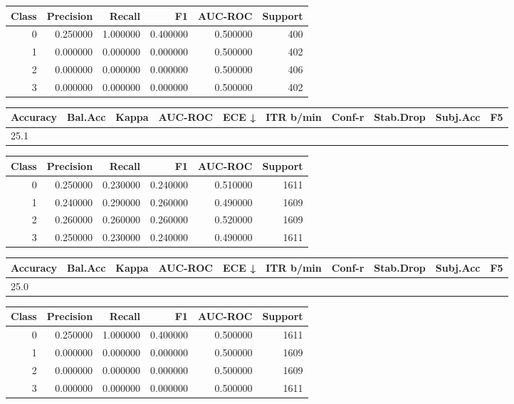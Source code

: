 \begin{tabular}{rrrrrr}
\toprule
Class & Precision & Recall & F1 & AUC-ROC & Support \\
\midrule
0 & 0.250000 & 1.000000 & 0.400000 & 0.500000 & 400 \\
1 & 0.000000 & 0.000000 & 0.000000 & 0.500000 & 402 \\
2 & 0.000000 & 0.000000 & 0.000000 & 0.500000 & 406 \\
3 & 0.000000 & 0.000000 & 0.000000 & 0.500000 & 402 \\
\bottomrule
\end{tabular}


\begin{tabular}{llrrrrrlll}
\toprule
Accuracy & Bal.Acc & Kappa & AUC-ROC & ECE ↓ & ITR b/min & Conf-r & Stab.Drop & Subj.Acc & F5 \\
\midrule
25.1%
\bottomrule
\end{tabular}


\begin{tabular}{rrrrrr}
\toprule
Class & Precision & Recall & F1 & AUC-ROC & Support \\
\midrule
0 & 0.250000 & 0.230000 & 0.240000 & 0.510000 & 1611 \\
1 & 0.240000 & 0.290000 & 0.260000 & 0.490000 & 1609 \\
2 & 0.260000 & 0.260000 & 0.260000 & 0.520000 & 1609 \\
3 & 0.250000 & 0.230000 & 0.240000 & 0.490000 & 1611 \\
\bottomrule
\end{tabular}


\begin{tabular}{llrrrrrlll}
\toprule
Accuracy & Bal.Acc & Kappa & AUC-ROC & ECE ↓ & ITR b/min & Conf-r & Stab.Drop & Subj.Acc & F5 \\
\midrule
25.0%
\bottomrule
\end{tabular}


\begin{tabular}{rrrrrr}
\toprule
Class & Precision & Recall & F1 & AUC-ROC & Support \\
\midrule
0 & 0.250000 & 1.000000 & 0.400000 & 0.500000 & 1611 \\
1 & 0.000000 & 0.000000 & 0.000000 & 0.500000 & 1609 \\
2 & 0.000000 & 0.000000 & 0.000000 & 0.500000 & 1609 \\
3 & 0.000000 & 0.000000 & 0.000000 & 0.500000 & 1611 \\
\bottomrule
\end{tabular}


